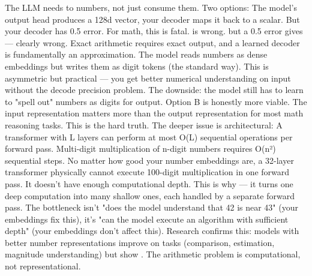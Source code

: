 {}The LLM needs to  numbers, not just consume them. Two options:\markdownRendererParagraphSeparator
{} The model's output head produces a 128d vector, your decoder maps it back to a scalar. But your decoder has \markdownRendererTilde{}0.5\markdownRendererPercentSign{} error. For math, this is fatal.  is wrong.  but a 0.5\markdownRendererPercentSign{} error gives  — clearly wrong. Exact arithmetic requires exact output, and a learned decoder is fundamentally an approximation.\markdownRendererParagraphSeparator
{} The model reads numbers as dense embeddings but writes them as digit tokens (the standard way). This is asymmetric but practical — you get better numerical understanding on input without the decode precision problem. The downside: the model still has to learn to "spell out" numbers as digits for output.\markdownRendererParagraphSeparator
{}Option B is honestly more viable. The input representation matters more than the output representation for most math reasoning tasks.\markdownRendererInterblockSeparator
{}
\markdownRendererSectionEnd \markdownRendererSectionBegin
{}\markdownRendererInterblockSeparator
{}This is the hard truth. The deeper issue is architectural:\markdownRendererParagraphSeparator
{} A transformer with L layers can perform at most O(L) sequential operations per forward pass. Multi-digit multiplication of n-digit numbers requires O(n²) sequential steps. No matter how good your number embeddings are, a 32-layer transformer physically cannot execute 100-digit multiplication in one forward pass. It doesn't have enough computational depth.\markdownRendererParagraphSeparator
{}This is why  — it turns one deep computation into many shallow ones, each handled by a separate forward pass. The bottleneck isn't "does the model understand that 42 is near 43" (your embeddings fix this), it's "can the model execute an algorithm with sufficient depth" (your embeddings don't affect this).\markdownRendererParagraphSeparator
{}Research confirms this: models with better number representations improve on  tasks (comparison, estimation, magnitude understanding) but show . The arithmetic problem is computational, not representational.\markdownRendererInterblockSeparator
